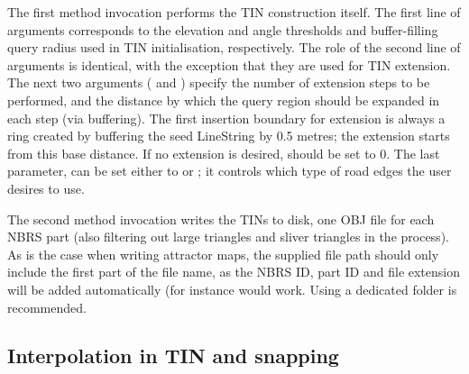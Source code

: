 The first method invocation performs the TIN construction itself. The first line of arguments corresponds to the elevation and angle thresholds and buffer-filling query radius used in TIN initialisation, respectively. The role of the second line of arguments is identical, with the exception that they are used for TIN extension. The next two arguments ( and ) specify the number of extension steps to be performed, and the distance by which the query region should be expanded in each step (via buffering). The first insertion boundary for extension is always a ring created by buffering the seed LineString by 0.5 metres; the extension starts from this base distance. If no extension is desired,  should be set to 0. The last parameter,  can be set either to  or ; it controls which type of road edges the user desires to use.

The second method invocation writes the TINs to disk, one OBJ file for each NBRS part (also filtering out large triangles and sliver triangles in the process). As is the case when writing attractor maps, the supplied file path should only include the first part of  the file name, as the NBRS ID, part ID and file extension will be added automatically (for instance  would work. Using a dedicated folder is recommended.

\subsection{Interpolation in TIN and snapping}
\label{sub:r_interpolation}

